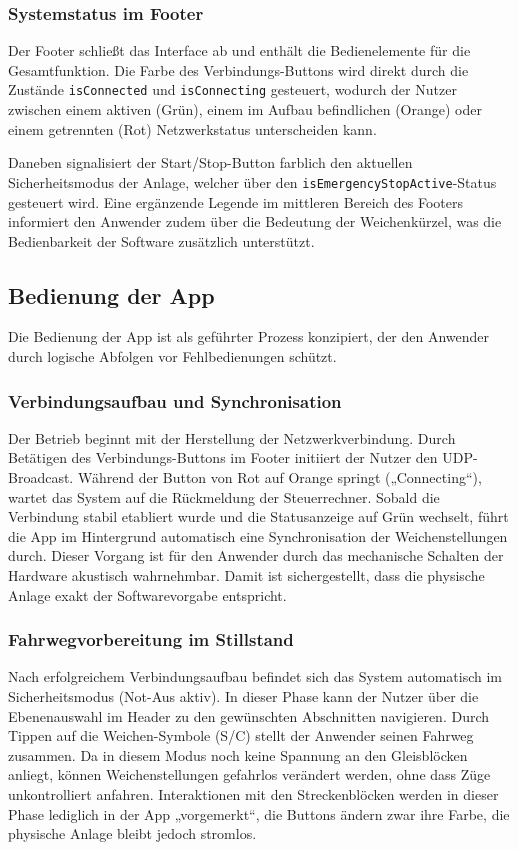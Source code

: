 \documentclass{article}
\begin{document}
\subsubsection{Systemstatus im Footer}
Der Footer schließt das Interface ab und enthält die Bedienelemente für die Gesamtfunktion.
Die Farbe des Verbindungs-Buttons wird direkt durch die Zustände \texttt{is\-Connected} und \texttt{is\-Connecting} gesteuert, wodurch der Nutzer zwischen einem aktiven (Grün), einem im Aufbau befindlichen (Orange) oder einem getrennten (Rot) Netzwerkstatus unterscheiden kann.

Daneben signalisiert der Start/Stop-Button farblich den aktuellen Sicherheitsmodus der Anlage, welcher über den \texttt{is\-Emergency\-Stop\-Active}-Status gesteuert wird.
Eine ergänzende Legende im mittleren Bereich des Footers informiert den Anwender zudem über die Bedeutung der Weichenkürzel, was die Bedienbarkeit der Software zusätzlich unterstützt.



\subsection{Bedienung der App}
Die Bedienung der App ist als geführter Prozess konzipiert, der den Anwender durch logische Abfolgen vor Fehlbedienungen schützt.

\subsubsection{Verbindungsaufbau und Synchronisation}
Der Betrieb beginnt mit der Herstellung der Netzwerkverbindung.
Durch Betätigen des Verbindungs-Buttons im Footer initiiert der Nutzer den UDP-Broadcast.
Während der Button von Rot auf Orange springt („Connecting“), wartet das System auf die Rückmeldung der Steuerrechner.
Sobald die Verbindung stabil etabliert wurde und die Statusanzeige auf Grün wechselt, führt die App im Hintergrund automatisch eine Synchronisation der Weichenstellungen durch.
Dieser Vorgang ist für den Anwender durch das mechanische Schalten der Hardware akustisch wahrnehmbar.
Damit ist sichergestellt, dass die physische Anlage exakt der Softwarevorgabe entspricht.

\subsubsection{Fahrwegvorbereitung im Stillstand}
Nach erfolgreichem Verbindungsaufbau befindet sich das System automatisch im Sicherheitsmodus (Not-Aus aktiv).
In dieser Phase kann der Nutzer über die Ebenenauswahl im Header zu den gewünschten Abschnitten navigieren.
Durch Tippen auf die Weichen-Symbole (S/C) stellt der Anwender seinen Fahrweg zusammen.
Da in diesem Modus noch keine Spannung an den Gleisblöcken anliegt, können Weichenstellungen gefahrlos verändert werden, ohne dass Züge unkontrolliert anfahren.
Interaktionen mit den Streckenblöcken werden in dieser Phase lediglich in der App „vorgemerkt“, die Buttons ändern zwar ihre Farbe, die physische Anlage bleibt jedoch stromlos.
\end{document}
